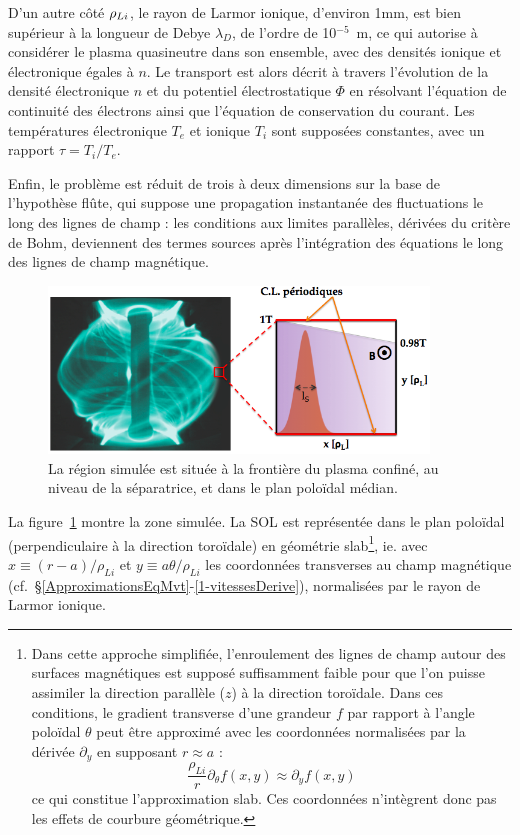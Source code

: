 \begin{refsection}
D'un autre côté $\rho{_{Li}}$, le rayon de Larmor ionique, d'environ
1mm, est bien supérieur à la longueur de
Debye $\lambda_D$, de l'ordre de 10$^{-5}$~m, ce qui autorise à
considérer le plasma quasineutre dans son ensemble, avec des densités ionique
et électronique égales à $n$.
Le transport est alors décrit à travers l'évolution de la densité
électronique $n$ et du potentiel électrostatique $\Phi$ en résolvant l'équation
de continuité des électrons ainsi que l'équation de conservation du courant. Les
températures électronique
$T_e$ et ionique $T_i$ sont supposées constantes, avec un rapport $\tau=T_i/T_e$.

Enfin, le problème est réduit de trois à deux dimensions sur la base de l'hypothèse
flûte, qui suppose une propagation instantanée des fluctuations le long des
lignes de champ : les conditions aux limites parallèles, dérivées du critère de
Bohm, deviennent des termes sources après l'intégration des équations le long
des lignes de champ magnétique.

\begin{figure}[!htbp]
\centering
    \includegraphics[width=0.9\textwidth]{figures/2-tokamSimDomain.png}
    \caption{La région simulée est située à la frontière du plasma confiné,
    au niveau de la séparatrice, et dans le plan poloïdal médian.}
    \label{2-figTokamGeom}
\end{figure}

La figure~\ref{2-figTokamGeom} montre la zone simulée. La SOL est représentée dans le plan
poloïdal (perpendiculaire à la direction toroïdale)
en géométrie slab\footnote{Dans cette approche simplifiée, l'enroulement des
lignes de champ autour des surfaces magnétiques est supposé suffisamment
faible pour que l'on puisse assimiler la direction parallèle ($z$) à la
direction toroïdale. Dans ces conditions, le gradient transverse d'une
grandeur $f$ par rapport à l'angle poloïdal $\theta$ peut être approximé avec
les coordonnées normalisées par la dérivée $\partial_y$ en supposant $r\approx
a$ :
$$\frac{\rho_{Li}}{r}\partial_\theta f(x,y)\approx\partial_y
f(x,y)$$
ce qui constitue l'approximation slab. Ces
coordonnées n'intègrent donc pas les effets de courbure géométrique.}, ie.
avec $x\equiv(r-a)/\rho_{Li}$ et $y\equiv a\theta/\rho_{Li}$ les coordonnées
transverses au champ magnétique
(cf.~\S\ref{ApproximationsEqMvt}-\ref{1-vitessesDerive}), normalisées par le rayon de Larmor ionique.


\end{refsection}
